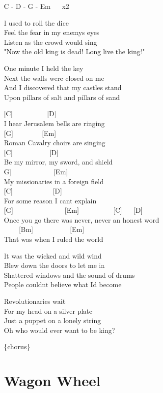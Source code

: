 \documentclass[
  letterpaper,
]{scrbook}
\begin{document}
C - D - G - Em ~ ~x2

I used to roll the dice\\
Feel the fear in my enemy\textquotesingle s eyes\\
Listen as the crowd would sing\\
"Now the old king is dead! Long live the king!"

One minute I held the key\\
Next the walls were closed on me\\
And I discovered that my castles stand\\
Upon pillars of salt and pillars of sand

{[}C{]} ~ ~ ~ ~ ~ ~{[}D{]}\\
I hear Jerusalem bells are ringing\\
{[}G{]} ~ ~ ~ ~ ~{[}Em{]}\\
Roman Cavalry choirs are singing\\
{[}C{]} ~ ~ ~ ~ ~ ~ {[}D{]}\\
Be my mirror, my sword, and shield\\
\hspace*{0.333em}{[}G{]} ~ ~ ~ ~ ~ ~ ~ {[}Em{]}\\
My missionaries in a foreign field\\
{[}C{]} ~ ~ ~ ~ ~ ~ ~{[}D{]}\\
For some reason I can\textquotesingle t explain\\
{[}G{]} ~ ~ ~ ~ ~ ~ ~ ~ ~{[}Em{]} ~ ~ ~ ~ ~ ~{[}C{]} ~ ~{[}D{]}\\
Once you go there was never, never an honest word\\
\hspace*{0.333em} ~ ~ ~{[}Bm{]} ~ ~ ~ ~ ~ ~ {[}Em{]}\\
That was when I ruled the world

It was the wicked and wild wind\\
Blew down the doors to let me in\\
Shattered windows and the sound of drums\\
People couldn\textquotesingle t believe what I\textquotesingle d become

Revolutionaries wait\\
For my head on a silver plate\\
Just a puppet on a lonely string\\
Oh who would ever want to be king?

\{chorus\}

\hypertarget{wagon-wheel}{%
\chapter{Wagon Wheel}\label{wagon-wheel}}
\end{document}
